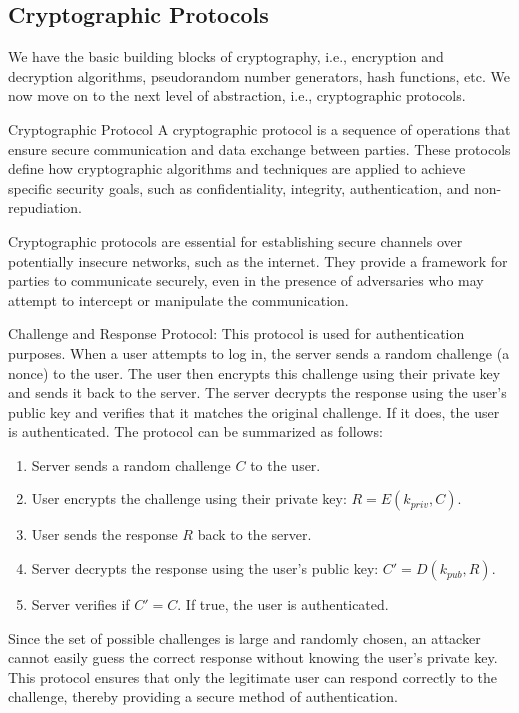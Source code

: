 \documentclass[openany]{book}
\begin{document}
\subsection{Cryptographic Protocols}
We have the basic building blocks of cryptography, i.e., encryption and decryption algorithms, pseudorandom number generators, hash functions, etc. We now move on to the next level of abstraction, i.e., cryptographic protocols. 
\begin{mydefinition}{Cryptographic Protocol}
A cryptographic protocol is a sequence of operations that ensure secure communication and data exchange between parties. These protocols define how cryptographic algorithms and techniques are applied to achieve specific security goals, such as confidentiality, integrity, authentication, and non-repudiation.
\end{mydefinition}
Cryptographic protocols are essential for establishing secure channels over potentially insecure networks, such as the internet. They provide a framework for parties to communicate securely, even in the presence of adversaries who may attempt to intercept or manipulate the communication. \\
\begin{example}
    Challenge and Response Protocol: This protocol is used for authentication purposes. When a user attempts to log in, the server sends a random challenge (a nonce) to the user. The user then encrypts this challenge using their private key and sends it back to the server. The server decrypts the response using the user's public key and verifies that it matches the original challenge. If it does, the user is authenticated. The protocol can be summarized as follows:
    \begin{enumerate}
        \item Server sends a random challenge \( C \) to the user.
        \item User encrypts the challenge using their private key: \( R = E(k_{priv}, C) \).
        \item User sends the response \( R \) back to the server.
        \item Server decrypts the response using the user's public key: \( C' = D(k_{pub}, R) \).
        \item Server verifies if \( C' = C \). If true, the user is authenticated.
    \end{enumerate}
Since the set of possible challenges is large and randomly chosen, an attacker cannot easily guess the correct response without knowing the user's private key. This protocol ensures that only the legitimate user can respond correctly to the challenge, thereby providing a secure method of authentication.
\end{example}
\end{document}
